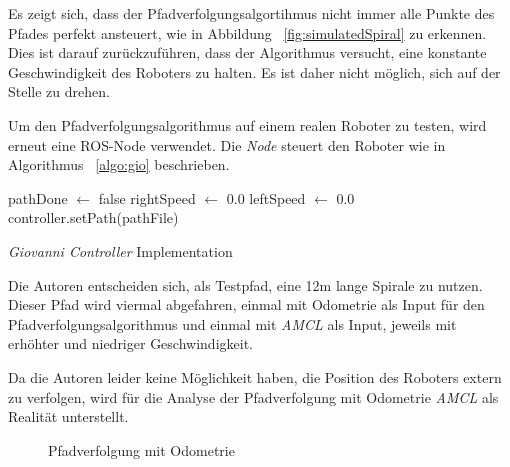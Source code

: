 \documentclass[11pt,a4paper]{article}
\begin{document}
{\begin{figure}[h]
\end{figure}
Es zeigt sich, dass der Pfadverfolgungsalgortihmus nicht immer alle Punkte des Pfades perfekt ansteuert, wie in Abbildung ~\ref{fig:simulatedSpiral} zu erkennen. Dies ist darauf zur\"uckzuf\"uhren, dass der Algorithmus versucht, eine konstante Geschwindigkeit des Roboters zu halten. Es ist daher nicht m\"oglich, sich auf der Stelle zu drehen.


\newpage
Um den Pfadverfolgungsalgorithmus auf einem realen Roboter zu testen, wird erneut eine ROS-Node verwendet. Die \textit{Node} steuert den Roboter wie in Algorithmus ~\ref{algo:gio} beschrieben.

\begin{algorithm}
	pathDone $\leftarrow$ false\;
	rightSpeed $\leftarrow$ 0.0\;
	leftSpeed $\leftarrow$ 0.0\;
	controller.setPath(pathFile)\;
\caption{\textit{Giovanni Controller} Implementation \label{algo:gio}}
\end{algorithm}

Die Autoren entscheiden sich, als Testpfad, eine 12m lange Spirale zu nutzen. Dieser Pfad wird viermal abgefahren, einmal mit Odometrie als Input f\"ur den Pfadverfolgungsalgorithmus und einmal mit \textit{AMCL} als Input, jeweils mit erh\"ohter und niedriger Geschwindigkeit.

Da die Autoren leider keine M\"oglichkeit haben, die Position des Roboters extern zu verfolgen, wird f\"ur die Analyse der Pfadverfolgung mit Odometrie \textit{AMCL} als Realit\"at unterstellt.
\newpage
\begin{figure}
	\centering
	\caption{Pfadverfolgung mit Odometrie}
\end{figure}

}
\end{document}

